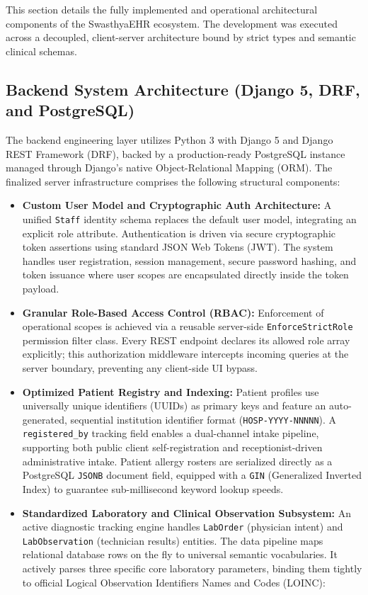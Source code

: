 \documentclass[12pt, a4paper]{report}
\numberwithin{equation}{chapter}
\begin{document}
This section details the fully implemented and operational architectural components of the SwasthyaEHR ecosystem. The development was executed across a decoupled, client-server architecture bound by strict types and semantic clinical schemas.

\subsection{Backend System Architecture (Django 5, DRF, and PostgreSQL)}
The backend engineering layer utilizes Python 3 with Django 5 and Django REST Framework (DRF), backed by a production-ready PostgreSQL instance managed through Django’s native Object-Relational Mapping (ORM). The finalized server infrastructure comprises the following structural components:
\begin{itemize}
    \item \textbf{Custom User Model and Cryptographic Auth Architecture:} A unified \texttt{Staff} identity schema replaces the default user model, integrating an explicit role attribute. Authentication is driven via secure cryptographic token assertions using standard JSON Web Tokens (JWT). The system handles user registration, session management, secure password hashing, and token issuance where user scopes are encapsulated directly inside the token payload.
    \item \textbf{Granular Role-Based Access Control (RBAC):} Enforcement of operational scopes is achieved via a reusable server-side \texttt{EnforceStrictRole} permission filter class. Every REST endpoint declares its allowed role array explicitly; this authorization middleware intercepts incoming queries at the server boundary, preventing any client-side UI bypass.
    \item \textbf{Optimized Patient Registry and Indexing:} Patient profiles use universally unique identifiers (UUIDs) as primary keys and feature an auto-generated, sequential institution identifier format (\texttt{HOSP-YYYY-NNNNN}). A \texttt{registered\_by} tracking field enables a dual-channel intake pipeline, supporting both public client self-registration and receptionist-driven administrative intake. Patient allergy rosters are serialized directly as a PostgreSQL \texttt{JSONB} document field, equipped with a \texttt{GIN} (Generalized Inverted Index) to guarantee sub-millisecond keyword lookup speeds.
    \item \textbf{Standardized Laboratory and Clinical Observation Subsystem:} An active diagnostic tracking engine handles \texttt{LabOrder} (physician intent) and \texttt{LabObservation} (technician results) entities. The data pipeline maps relational database rows on the fly to universal semantic vocabularies. It actively parses three specific core laboratory parameters, binding them tightly to official Logical Observation Identifiers Names and Codes (LOINC):

\end{itemize}
\end{document}

